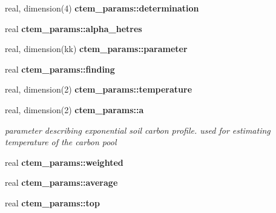 \begin{DoxyCompactItemize}
\item 
\hypertarget{namespacectem__params_af53786252d8e86d5237c1cc734734f7a}{}real, dimension(4) {\bfseries ctem\+\_\+params\+::determination}\label{namespacectem__params_af53786252d8e86d5237c1cc734734f7a}

\item 
\hypertarget{namespacectem__params_a403de9621ddedbe9dcc984bb874e8298}{}real {\bfseries ctem\+\_\+params\+::alpha\+\_\+hetres}\label{namespacectem__params_a403de9621ddedbe9dcc984bb874e8298}

\item 
\hypertarget{namespacectem__params_a7502bf796b8c78ad8643a5f42c1ae544}{}real, dimension(kk) {\bfseries ctem\+\_\+params\+::parameter}\label{namespacectem__params_a7502bf796b8c78ad8643a5f42c1ae544}

\item 
\hypertarget{namespacectem__params_a2fb35373785bef1950bfb5d7368d905e}{}real {\bfseries ctem\+\_\+params\+::finding}\label{namespacectem__params_a2fb35373785bef1950bfb5d7368d905e}

\item 
\hypertarget{namespacectem__params_a1ac4d0388d80689c0c8347f5daac04a7}{}real, dimension(2) {\bfseries ctem\+\_\+params\+::temperature}\label{namespacectem__params_a1ac4d0388d80689c0c8347f5daac04a7}

\item 
\hypertarget{namespacectem__params_a94c2d570320bf8d924764dea5174d6a2}{}real, dimension(2) {\bfseries ctem\+\_\+params\+::a}\label{namespacectem__params_a94c2d570320bf8d924764dea5174d6a2}

\begin{DoxyCompactList}\small\item\em parameter describing exponential soil carbon profile. used for estimating temperature of the carbon pool \end{DoxyCompactList}\item 
\hypertarget{namespacectem__params_a7df9aaac76fdd2c7b0735f8a54f682ef}{}real {\bfseries ctem\+\_\+params\+::weighted}\label{namespacectem__params_a7df9aaac76fdd2c7b0735f8a54f682ef}

\item 
\hypertarget{namespacectem__params_addbc6c6534d73c54d805f520f10bd51c}{}real {\bfseries ctem\+\_\+params\+::average}\label{namespacectem__params_addbc6c6534d73c54d805f520f10bd51c}

\item 
\hypertarget{namespacectem__params_ac5cb68a6fa59f4335b87c1901570a296}{}real {\bfseries ctem\+\_\+params\+::top}\label{namespacectem__params_ac5cb68a6fa59f4335b87c1901570a296}


\end{DoxyCompactItemize}
